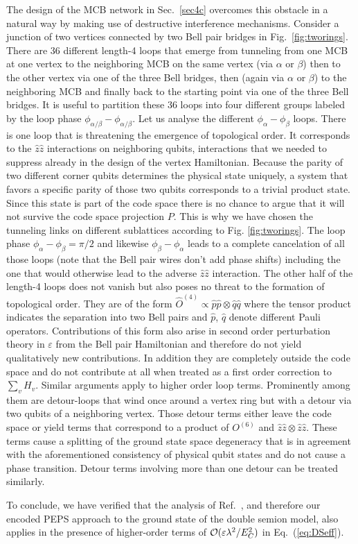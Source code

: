\documentclass[twocolumn,floats,prx,showpacs]{revtex4-1}
\begin{document}
The design of the MCB network in Sec.~\ref{sec4c} overcomes this obstacle in a natural way by making use of destructive interference mechanisms. Consider a junction of two vertices connected by two Bell pair bridges in Fig.~\ref{fig:tworings}. There are 36 different length-4 loops that emerge from tunneling from one MCB at one vertex to the neighboring MCB on the same vertex (via $\alpha$ or $\beta$) then to the other vertex via one of the three Bell bridges, then (again via $\alpha$ or $\beta$) to the neighboring MCB and finally back to the starting point via one of the three Bell bridges. It is useful to partition these 36 loops into four different groups labeled by the loop phase $ \phi_{\alpha/
\beta}-\phi_{\alpha/ \beta}$. Let us analyse the different $\phi_\alpha - \phi_\beta$ loops. There is one loop that is threatening the emergence of topological order. It corresponds to the $\hat z \hat z$ interactions on neighboring qubits, interactions that we needed to suppress already in the design of the vertex Hamiltonian. Because the parity of two different corner qubits determines the physical state uniquely, a system that favors a specific parity of those two qubits corresponds to a trivial product state. Since this state is part of the code space there is no chance to argue that it will not survive the code space projection $P$. This is why we have chosen the tunneling links on different sublattices according to Fig. \ref{fig:tworings}. The loop phase $\phi_\alpha -\phi_\beta=\pi/2$ and likewise $\phi_\beta-\phi_\alpha$ leads to a complete cancelation of all those loops (note that the Bell pair wires don't add phase shifts) including the one that would otherwise lead to the adverse $\hat z \hat z$ interaction. The other half of the length-4 loops does not vanish but also poses no threat to the formation of topological order.
They are  
of the form  $\hat O^{(4)}\propto\hat  p \hat p \otimes \hat q \hat q $
where the tensor product indicates the separation into two Bell pairs and $\hat p$, $\hat q$ denote different Pauli operators.  Contributions of this form also arise in second order perturbation theory in $\varepsilon$ from the Bell pair 
Hamiltonian and therefore do not yield qualitatively new contributions. In addition they are completely outside the code space and do not contribute at all when treated as a first order correction to $\sum_v H_v$. Similar arguments apply to higher order loop terms. Prominently among them are detour-loops that wind once around a vertex ring but with a detour via two qubits of a neighboring vertex. Those detour terms either leave the code space or yield terms that correspond to a product of $O^{(6)}$ and $\hat z \hat z \otimes \hat z \hat z$. These terms cause a splitting of the ground state space degeneracy that is in agreement with the aforementioned consistency of physical qubit states and do not cause a phase transition. Detour terms involving more than one detour can be treated similarly.


To conclude, we have verified that the analysis of Ref.~\cite{Brell2014}, and therefore our encoded PEPS approach to the ground state of the double semion model, also applies in the presence of higher-order terms of ${\cal O}(\varepsilon\lambda^2/E_C^2)$ in Eq.~(\ref{eq:DSeff}). 


\end{document}
